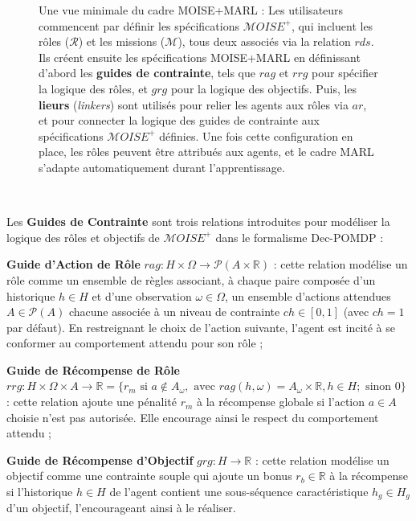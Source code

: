 \documentclass[pdflatex,sn-mathphys-num]{sn-jnl}%
\theoremstyle{thmstyleone}%
\theoremstyle{thmstyletwo}%
\theoremstyle{thmstylethree}%
\begin{document}
\begin{figure}[h!]
    \centering
    
    \caption{Une vue minimale du cadre MOISE+MARL :
        Les utilisateurs commencent par définir les spécifications $\mathcal{M}OISE^+$, qui incluent les rôles ($\mathcal{R}$) et les missions ($\mathcal{M}$), tous deux associés via la relation $rds$.  
        Ils créent ensuite les spécifications MOISE+MARL en définissant d’abord les \textbf{guides de contrainte}, tels que $rag$ et $rrg$ pour spécifier la logique des rôles, et $grg$ pour la logique des objectifs.  
        Puis, les \textbf{lieurs} (\textit{linkers}) sont utilisés pour relier les agents aux rôles via $ar$, et pour connecter la logique des guides de contrainte aux spécifications $\mathcal{M}OISE^+$ définies.  
        Une fois cette configuration en place, les rôles peuvent être attribués aux agents, et le cadre MARL s’adapte automatiquement durant l’apprentissage.}
    \label{fig:mm_synthesis}
\end{figure}

\

\noindent Les \textbf{Guides de Contrainte} sont trois relations introduites pour modéliser la logique des rôles et objectifs de $\mathcal{M}OISE^+$ dans le formalisme Dec-POMDP :

\begin{enumerate*}[label={\roman*) },itemjoin={; \quad}]
    \item \textbf{Guide d’Action de Rôle} \quad $rag: H \times \Omega \rightarrow \mathcal{P}(A \times \mathbb{R})$ : cette relation modélise un rôle comme un ensemble de règles associant, à chaque paire composée d’un historique $h \in H$ et d’une observation $\omega \in \Omega$, un ensemble d’actions attendues $A \in \mathcal{P}(A)$ chacune associée à un niveau de contrainte $ch \in [0,1]$ (avec $ch = 1$ par défaut). En restreignant le choix de l’action suivante, l’agent est incité à se conformer au comportement attendu pour son rôle ;
    
    \item \textbf{Guide de Récompense de Rôle} \quad $rrg: H \times \Omega \times A \to \mathbb{R} = \{r_m \text{ si } a \notin A_\omega, \text{ avec } rag(h, \omega) = A_\omega \times \mathbb{R}, h \in H; \text{ sinon } 0\}$ : cette relation ajoute une pénalité $r_m$ à la récompense globale si l’action $a \in A$ choisie n’est pas autorisée. Elle encourage ainsi le respect du comportement attendu ;
    
    \item \textbf{Guide de Récompense d’Objectif} \quad $grg: H \rightarrow \mathbb{R}$ : cette relation modélise un objectif comme une contrainte souple qui ajoute un bonus $r_b \in \mathbb{R}$ à la récompense si l’historique $h \in H$ de l’agent contient une sous-séquence caractéristique $h_g \in H_g$ d’un objectif, l’encourageant ainsi à le réaliser.
\end{enumerate*}
\end{document}

